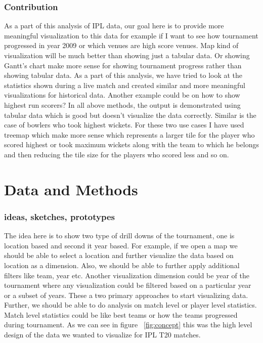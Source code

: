 \documentclass[sigconf]{acmart}
\begin{document}
\subsubsection{Contribution}
As a part of this analysis of IPL data, our goal here is to provide
more meaningful visualization to this data for example if I want to 
see how tournament progressed in year 2009 or which venues 
are high score venues. Map kind of visualization will be much better than showing
just a tabular data. Or showing Gantt's chart make more sense for 
showing tournament progress rather than showing tabular data. 
As a part of this analysis, we have tried to look at the statistics shown during a 
live match and created similar and more meaningful visualizations for historical data. 
Another example could be on how to show highest run scorers? In all above
methods, the output is demonstrated using tabular data which is good but doesn't 
visualize the data correctly. Similar is the case of bowlers who took highest wickets. 
For these two use cases I have used treemap which make more sense which represents
a larger tile for the player who scored highest or took maximum wickets along with the 
team to which he belongs and then reducing the tile size for the players who scored less
and so on.  

\section{Data and Methods}
\subsubsection{ideas, sketches, prototypes}
The idea here is to show two type of drill downs of the tournament, one is location based
and second it year based. For example, if we open a map we should be able to select a location
and further visualize the data based on location as a dimension. Also, we should be able to
further apply additional filters like team, year etc. Another visualization dimension could be 
year of the tournament where any visualization could be filtered based on a particular year 
or a subset of years. These a two primary approaches to start visualizing data. Further, we 
should be able to do analysis on match level or player level statistics. Match level statistics 
could be like best teams or how the teams progressed during tournament. As we can see
in figure ~\ref{fig:concept} this was the high level design of the data we wanted to visualize 
for IPL T20 matches.
\end{document}
